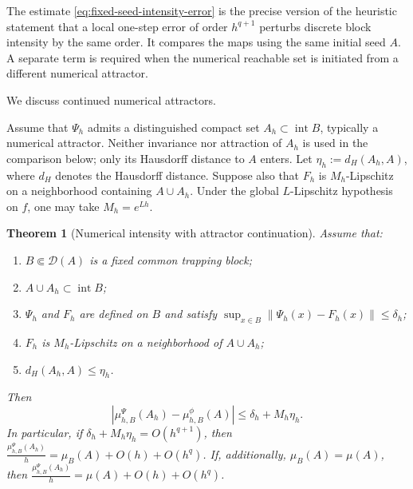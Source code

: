 \documentclass[pdflatex,sn-mathphys-num]{sn-jnl}
\numberwithin{equation}{section}
\theoremstyle{thmstyleone}%
\newtheorem{theorem}{Theorem}[section]
\theoremstyle{definition}
\theoremstyle{remark}
\begin{document}
The estimate \eqref{eq:fixed-seed-intensity-error} is the precise version of the heuristic statement that a local one-step error of order $h^{q+1}$ perturbs discrete block intensity by the same order. It compares the maps using the same initial seed $A$. A separate term is required when the numerical reachable set is initiated from a different numerical attractor.

We discuss continued numerical attractors.

Assume that $\Psi_h$ admits a distinguished compact set $A_h\subset\operatorname{int}B$, typically a numerical attractor. Neither invariance nor attraction of $A_h$ is used in the comparison below; only its Hausdorff distance to $A$ enters. Let $\eta_h:=d_H(A_h,A)$, where $d_H$ denotes the Hausdorff distance. Suppose also that $F_h$ is $M_h$-Lipschitz on a neighborhood containing $A\cup A_h$. Under the global $L$-Lipschitz hypothesis on $f$, one may take $M_h=e^{Lh}$.

\begin{theorem}[Numerical intensity with attractor continuation]
\label{thm:numerical-intensity}
Assume that:
\begin{enumerate}
\item $B\Subset\mathcal D(A)$ is a fixed common trapping block;
\item $A\cup A_h\subset\operatorname{int}B$;
\item $\Psi_h$ and $F_h$ are defined on $B$ and satisfy $\sup_{x\in B}\|\Psi_h(x)-F_h(x)\|\leq\delta_h$;
\item $F_h$ is $M_h$-Lipschitz on a neighborhood of $A\cup A_h$;
\item $d_H(A_h,A)\leq\eta_h$.
\end{enumerate}
Then
\begin{equation}
\label{eq:numerical-attractor-intensity-error}
    \left|
    \mu_{h,B}^{\Psi}(A_h)
    -
    \mu_{h,B}^{\phi}(A)
    \right|
    \leq
    \delta_h+M_h\eta_h.
\end{equation}
In particular, if $\delta_h+M_h\eta_h = O(h^{q+1})$, then $\frac{\mu_{h,B}^{\Psi}(A_h)}{h} = \mu_B(A)+O(h)+O(h^q)$. If, additionally, $\mu_B(A)=\mu(A)$, then $\frac{\mu_{h,B}^{\Psi}(A_h)}{h} = \mu(A)+O(h)+O(h^q)$.
\end{theorem}
\end{document}
